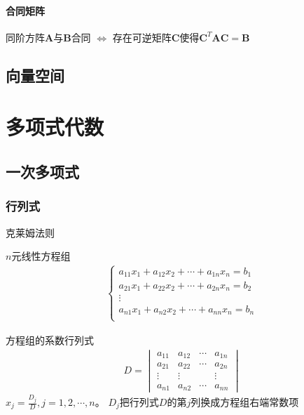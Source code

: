 \documentclass[12pt]{book}
\begin{document}
\subsubsection{合同矩阵}

同阶方阵$\bm{A}$与$\bm{B}$合同 
$\Leftrightarrow$ 存在可逆矩阵$\bm{C}$使得$\bm{C}^{T}\bm{A}\bm{C}=\bm{B}$









\section{向量空间}



\chapter{多项式代数}



\section{一次多项式}


\subsection{行列式}



克莱姆法则


$n$元线性方程组
\begin{gather*}
    \begin{cases}
       a_{11} x_{1} + a_{12} x_{2} + \cdots + a_{1n} x_{n} = b_{1} \\
       a_{21} x_{1} + a_{22} x_{2} + \cdots + a_{2n} x_{n} = b_{2} \\
       \vdots \\
       a_{n1} x_{1} + a_{n2} x_{2} + \cdots + a_{nn} x_{n} = b_{n} \\
    \end{cases}
\end{gather*}

方程组的系数行列式
\begin{gather*}
    D = \begin{vmatrix}
        a_{11} & a_{12} & \cdots & a_{1n} \\
        a_{21} & a_{22} & \cdots & a_{2n} \\
        \vdots & \vdots &        & \vdots \\
        a_{n1} & a_{n2} & \cdots & a_{nn} 
    \end{vmatrix}
\end{gather*}
$x_{j} = \frac{D_j}{D}, j=1,2,\cdots,n$。
$D_j$把行列式$D$的第$j$列换成方程组右端常数项
\end{document}
